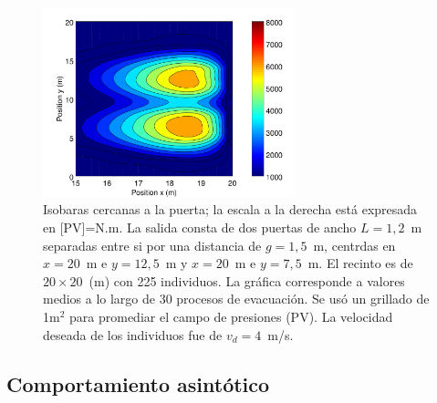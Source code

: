 \begin{figure}[H]
    \centering
    \includegraphics[height=5.5cm]{figuras/press_225p_v4_g5.png}			\caption[width=5cm]{Isobaras cercanas a la puerta; la escala a la derecha está expresada en [PV]=N.m. La salida consta de dos puertas de ancho $L=1,2$~m separadas entre si por una distancia de $g=1,5$~m, centrdas en $x=20$~m e $y=12,5$~m y $x=20$~m e $y=7,5$~m. El recinto es de $20\times 20$~(m) con 225 individuos. La gráfica corresponde a valores medios a lo largo de 30 procesos de evacuación. Se usó un grillado de 1m$^2$ para promediar el campo de presiones (PV). La velocidad deseada de los individuos fue de $v_d=4$~m/s.}
    \label{presion_225p_g5}
\end{figure}




\subsection{Comportamiento asintótico}




